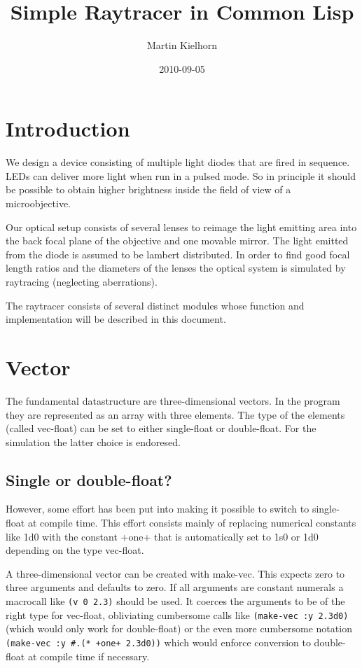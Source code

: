 \documentclass[twocolumn,DIV20]{scrartcl}
\title{Simple Raytracer in Common Lisp}
\author{Martin Kielhorn}
\date{2010-09-05}
\begin{document}
\maketitle
\section{Introduction}
We design a device consisting of multiple light diodes that are fired
in sequence. LEDs can deliver more light when run in a pulsed mode. So
in principle it should be possible to obtain higher brightness inside
the field of view of a microobjective.

Our optical setup consists of several lenses to reimage the light
emitting area into the back focal plane of the objective and one
movable mirror. The light emitted from the diode is assumed to be
lambert distributed. In order to find good focal length ratios and the
diameters of the lenses the optical system is simulated by raytracing
(neglecting aberrations).

The raytracer consists of several distinct modules whose function and
implementation will be described in this document.

\section{Vector}
The fundamental datastructure are three-dimensional vectors. In the
program they are represented as an array with three elements. The type
of the elements (called vec-float) can be set to either single-float
or double-float. For the simulation the latter choice is
endoresed. 
\subsection{Single or double-float?}
However, some effort has been put into making it possible
to switch to single-float at compile time. This effort consists mainly
of replacing numerical constants like 1d0 with the constant +one+ that
is automatically set to 1s0 or 1d0 depending on the type vec-float.

A three-dimensional vector can be created with make-vec. This expects
zero to three arguments and defaults to zero. If all arguments are
constant numerals a macrocall like \verb!(v 0 2.3)! should be
used. It coerces the arguments to be of the right type for vec-float,
obliviating cumbersome calls like \verb!(make-vec :y 2.3d0)!
(which would only work for double-float) or the even more cumbersome
notation \verb!(make-vec :y #.(* +one+ 2.3d0))!
which would enforce conversion to double-float at compile time if
necessary.
\end{document}
